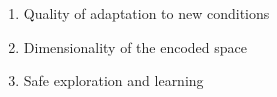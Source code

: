 \documentclass[letterpaper, 10 pt, conference]{ieeeconf}  %
\begin{document}
\begin{enumerate}
    \item Quality of adaptation to new conditions
    \item Dimensionality of the encoded space
    \item Safe exploration and learning 
\end{enumerate}
\end{document}
